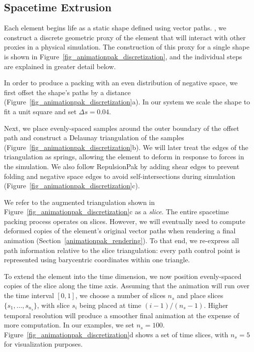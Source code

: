 \subsection{Spacetime Extrusion}
\label{animationpak_spacetime_extrusion}

Each element begins life as a static shape defined using
vector paths.  , we construct a discrete
geometric proxy of the element that will interact with other
proxies in a physical simulation.  The construction of this proxy
for a single shape is shown in Figure~\ref{fig_animationpak_discretization}, and
the individual steps are explained in greater detail below.

In order to produce a packing with an even distribution of negative
space, we first offset the shape's paths by a distance 
(Figure~\ref{fig_animationpak_discretization}a).  In our system
we scale the shape to fit a unit square and set $\Delta s=0.04$.

\newtext
{
Next, we place evenly-spaced samples around the outer boundary of 
the offset path and construct a Delaunay triangulation of the samples
(Figure~\ref{fig_animationpak_discretization}b). We will
later treat the edges of the triangulation as springs, allowing the
element to deform in response to forces in the simulation.  
We also follow RepulsionPak by adding shear edges to prevent
folding and negative space edges to avoid self-intersections during simulation
(Figure~\ref{fig_animationpak_discretization}c).
}

We refer to the augmented triangulation shown in 
Figure~\ref{fig_animationpak_discretization}c as a \textit{slice}.  
The entire spacetime packing process operates on slices.  
However, we will eventually
need to compute deformed copies of the element's original vector paths 
when rendering a final animation (Section~\ref{animationpak_rendering}).
To that end, we re-express all path information relative to the
slice triangulation: every path control point is represented using
barycentric coordinates within one triangle.

To extend the element into the time dimension, 
we now position evenly-spaced copies of the slice along the time axis.
Assuming that the animation will run over the time interval $[0,1]$, 
we choose a number of slices $n_s$ and place slices $\{s_1,\ldots,s_{n_s}\}$,
with slice $s_i$ being placed at time $(i-1)/(n_s-1)$.
Higher temporal resolution will
produce a smoother final animation at the expense of more computation.
In our examples, we set $n_s=100$. 
Figure~\ref{fig_animationpak_discretization}d shows a set of time slices, with
$n_s=5$ for visualization purposes.

